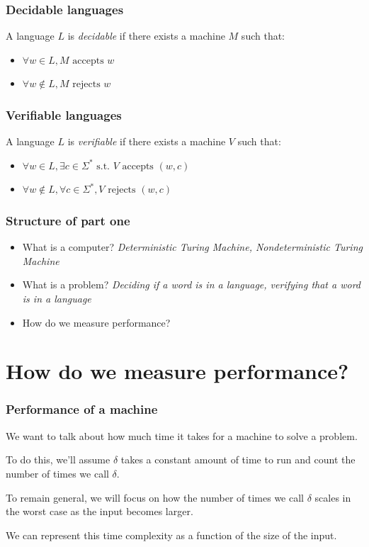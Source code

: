 \documentclass[aspectratio=169]{beamer}
\begin{document}
\begin{frame}
\frametitle{Decidable languages}
A language $L$ is {\em decidable} if there exists a machine $M$ such that:

\begin{itemize}
    \item $\forall w \in L, M \text{ accepts } w$
    \item $\forall w \notin L, M \text{ rejects } w$
\end{itemize}
\end{frame}

\begin{frame}
\frametitle{Verifiable languages}
A language $L$ is {\em verifiable} if there exists a machine $V$ such that:

\begin{itemize}
    \item $\forall w \in L, \exists c \in \Sigma^* \text{ s.t. } V \text{ accepts } (w,c)$
    \item $\forall w \notin L, \forall c \in \Sigma^*, V \text{ rejects } (w,c)$
\end{itemize}
\end{frame}

\begin{frame}
\frametitle{Structure of part one}
\begin{itemize}
    \item What is a computer? {\em Deterministic Turing Machine, Nondeterministic Turing Machine}
    \item What is a problem? {\em Deciding if a word is in a language, verifying that a word is in a language}
    \item How do we measure performance?
\end{itemize}
\end{frame}

\section{How do we measure performance?}

\begin{frame}
\frametitle{Performance of a machine}
We want to talk about how much time it takes for a machine to solve a problem.

To do this, we'll assume $\delta$ takes a constant amount of time to run and count the number of times we call $\delta$.

To remain general, we will focus on how the number of times we call $\delta$ scales in the worst case as the input becomes larger.

We can represent this time complexity as a function of the size of the input.
\end{frame}
\end{document}
